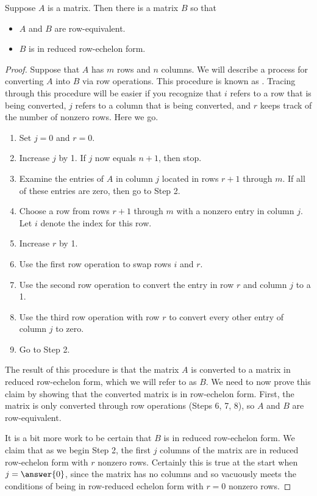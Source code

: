 \documentclass{ximera}
\begin{document}
\begin{theorem}
  Suppose $A$ is a matrix.  Then there is a matrix $B$ so that
  \begin{itemize}
  \item $A$ and $B$ are row-equivalent.
  \item $B$ is in reduced row-echelon form.
  \end{itemize}

\begin{proof}
Suppose that $A$ has $m$ rows and $n$ columns.  We will describe a process for converting $A$ into $B$ via row operations.  This procedure is known as .  Tracing through this procedure will be easier if you recognize that $i$ refers to a row that is being converted, $j$ refers to a column that is being converted, and $r$ keeps track of the number of nonzero rows.  Here we go.

\begin{enumerate}
\item Set $j=0$ and $r=0$.
\item Increase $j$ by 1.  If $j$ now equals $n+1$, then stop.
\item Examine the entries of $A$ in column $j$ located in rows $r+1$ through $m$.  If all of these entries are zero, then go to Step 2.
\item Choose a row from rows $r+1$ through $m$ with a nonzero entry in column $j$.  Let $i$ denote the index for this row.
\item Increase $r$ by 1.
\item Use the first row operation to swap rows $i$ and $r$.
\item Use the second row operation to convert the entry in row $r$ and column $j$ to a 1.
\item Use the third row operation with row $r$ to convert every other entry of column $j$ to zero.
\item Go to Step 2.
\end{enumerate}

The result of this procedure is that the matrix $A$ is converted to a
matrix in reduced row-echelon form, which we will refer to as $B$.  We
need to now prove this claim by showing that the converted matrix is
in row-echelon form.  First, the matrix is only converted through row
operations (Steps 6, 7, 8), so $A$ and $B$ are row-equivalent.

It is a bit more work to be certain that $B$ is in reduced row-echelon
form.  We claim that as we begin Step 2, the first $j$ columns of the
matrix are in reduced row-echelon form with $r$ nonzero rows.
Certainly this is true at the start when $j=\answer{0}$, since the
matrix has no columns and so vacuously meets the conditions of being
in row-reduced echelon form with $r=0$ nonzero rows.


\end{proof}
\end{theorem}
\end{document}
